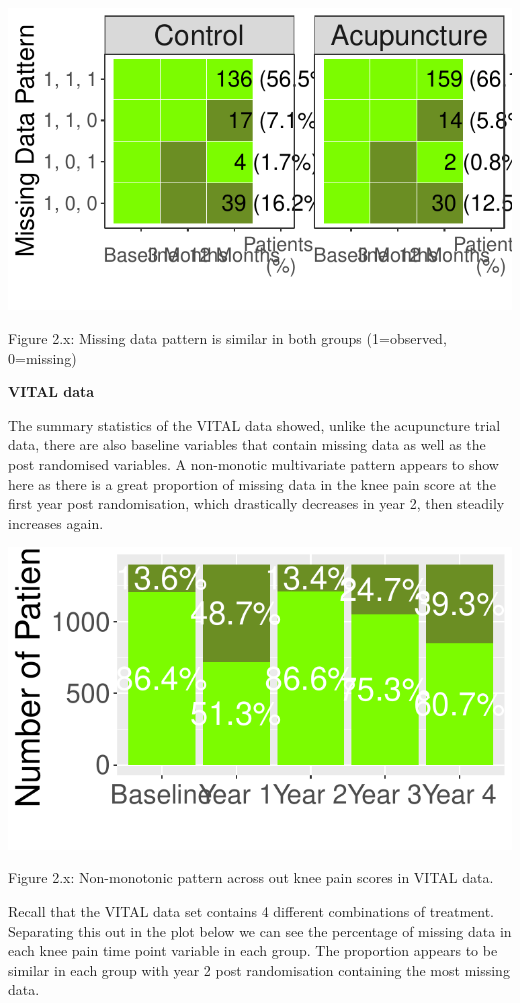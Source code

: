 \documentclass{article}
\newcommand{\pandocbounded}[1]{#1}
\begin{document}
\pandocbounded{\includegraphics[keepaspectratio]{Final_Report_files/figure-latex/unnamed-chunk-24-1.pdf}}

Figure 2.x: Missing data pattern is similar in both groups (1=observed,
0=missing)

\textbf{VITAL data}

The summary statistics of the VITAL data showed, unlike the acupuncture
trial data, there are also baseline variables that contain missing data
as well as the post randomised variables. A non-monotic multivariate
pattern appears to show here as there is a great proportion of missing
data in the knee pain score at the first year post randomisation, which
drastically decreases in year 2, then steadily increases again.

\pandocbounded{\includegraphics[keepaspectratio]{Final_Report_files/figure-latex/unnamed-chunk-25-1.pdf}}

Figure 2.x: Non-monotonic pattern across out knee pain scores in VITAL
data.

Recall that the VITAL data set contains 4 different combinations of
treatment. Separating this out in the plot below we can see the
percentage of missing data in each knee pain time point variable in each
group. The proportion appears to be similar in each group with year 2
post randomisation containing the most missing data.
\end{document}
